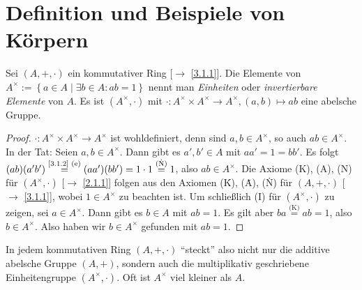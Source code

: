 \documentclass[../../main.tex]{subfiles}
\begin{document}
\section{Definition und Beispiele von Körpern}

\begin{defprop}\label{4.1.1}
Sei $(A,+,\cdot)$ ein kommutativer Ring [$\to$ \ref{3.1.1}]. Die Elemente von $A^\times :=\left\{a\in A\mid \exists b\in A:ab=1\right\}$ nennt man \emph{Einheiten} oder \emph{invertierbare Elemente} von $A$. Es ist $(A^\times, \cdot)$ mit $\cdot:A^\times\times A^\times\to A^\times, (a,b)\mapsto ab$ eine abelsche Gruppe.
\end{defprop}
\begin{proof}
$\cdot:A^\times\times A^\times\to A^\times$ ist wohldefiniert, denn sind $a,b\in A^\times$, so auch $ab\in A^\times$. In der Tat: Seien $a,b\in A^\times$. Dann gibt es $a',b'\in A$ mit $aa'=1=bb'$. Es folgt $(ab)(a'b')\overset{\text{\ref{3.1.2} (e)}}=(aa')(bb')=1\cdot1\overset{\text{(\.N)}}=1$, also $ab\in A^\times$. Die Axiome (K), (A), (N) für $(A^\times,\cdot)$ [$\to$ \ref{2.1.1}] folgen aus den Axiomen (\. K), (\. A), (\. N) für $(A,+,\cdot)$ [$\to$ \ref{3.1.1}], wobei $1\in A^\times$ zu beachten ist. Um schließlich (I) für $(A^\times,\cdot)$ zu zeigen, sei $a\in A^\times$. Dann gibt es $b\in A$ mit $ab=1$. Es gilt aber $ba\overset{\text{(\. K)}}=ab = 1$, also $b\in A^\times$. Also haben wir $b\in A^\times$ gefunden mit $ab=1$.
\end{proof}

\begin{bem}\label{4.1.2}
In jedem kommutativen Ring $(A,+,\cdot)$ "`steckt"' also nicht nur die additive abelsche Gruppe $(A,+)$, sondern auch die multiplikativ geschriebene Einheitengruppe $(A^\times,\cdot)$. Oft ist $A^\times$ viel kleiner als $A$.
\end{bem}
\end{document}
